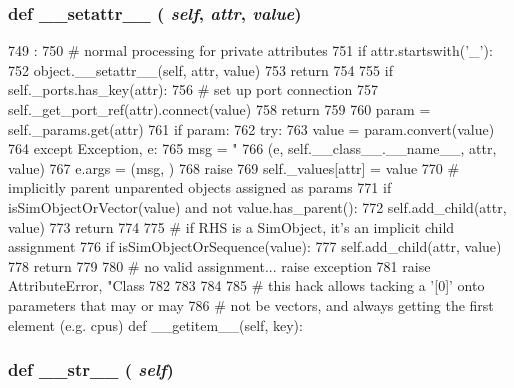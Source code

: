 \hypertarget{classm5_1_1SimObject_1_1SimObject_a6287b7a16286568d5442b6e2e90215b5}{
\subsubsection[{\_\-\_\-setattr\_\-\_\-}]{\setlength{\rightskip}{0pt plus 5cm}def \_\-\_\-setattr\_\-\_\- ( {\em self}, \/   {\em attr}, \/   {\em value})}}
\label{classm5_1_1SimObject_1_1SimObject_a6287b7a16286568d5442b6e2e90215b5}



\begin{DoxyCode}
749                                       :
750         # normal processing for private attributes
751         if attr.startswith('_'):
752             object.__setattr__(self, attr, value)
753             return
754 
755         if self._ports.has_key(attr):
756             # set up port connection
757             self._get_port_ref(attr).connect(value)
758             return
759 
760         param = self._params.get(attr)
761         if param:
762             try:
763                 value = param.convert(value)
764             except Exception, e:
765                 msg = "%
766                       (e, self.__class__.__name__, attr, value)
767                 e.args = (msg, )
768                 raise
769             self._values[attr] = value
770             # implicitly parent unparented objects assigned as params
771             if isSimObjectOrVector(value) and not value.has_parent():
772                 self.add_child(attr, value)
773             return
774 
775         # if RHS is a SimObject, it's an implicit child assignment
776         if isSimObjectOrSequence(value):
777             self.add_child(attr, value)
778             return
779 
780         # no valid assignment... raise exception
781         raise AttributeError, "Class %
782               %
783 
784 
785     # this hack allows tacking a '[0]' onto parameters that may or may
786     # not be vectors, and always getting the first element (e.g. cpus)
    def __getitem__(self, key):
\end{DoxyCode}
\hypertarget{classm5_1_1SimObject_1_1SimObject_aa7a4b9bc0941308e362738503137460e}{
\subsubsection[{\_\-\_\-str\_\-\_\-}]{\setlength{\rightskip}{0pt plus 5cm}def \_\-\_\-str\_\-\_\- ( {\em self})}}
\label{classm5_1_1SimObject_1_1SimObject_aa7a4b9bc0941308e362738503137460e}



